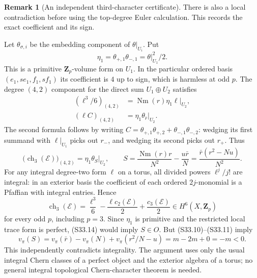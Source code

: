 \documentclass[11pt,a4paper]{article}
\theoremstyle{definition}
\newtheorem{remark}[theorem]{Remark}
\begin{document}
\begin{remark}[An independent third-character certificate]
There is also a local contradiction before using the top-degree Euler calculation. This records the exact coefficient and its sign.

Let \(\theta_{\sigma,i}\) be the embedding component of \(\theta|_{U_i}\). Put \[
 \eta_1=\theta_{+,1}\theta_{-,1}
       =\theta|_{U_1}^2/2.
\] This is a primitive \(\mathbf Z_p\)-volume form on \(U_1\). In the particular ordered basis \((e_1,se_1,f_1,sf_1)\) its coefficient is \(4\) up to sign, which is harmless at odd \(p\). The degree \((4,2)\) component for the direct sum \(U_1\oplus U_2\) satisfies \[
 \begin{aligned}
 (\ell^3/6)_{(4,2)}
    &=\operatorname{Nm}(r)\eta_1\ell|_{U_2},\\
 (\ell C)_{(4,2)}
    &=\eta_1\theta_{\bar r}|_{U_2}.
 \end{aligned}
\] The second formula follows by writing \(C=\theta_{+,1}\theta_{+,2}+\theta_{-,1}\theta_{-,2}\): wedging its first summand with \(\ell|_{U_1}\) picks out \(r_-\), and wedging its second picks out \(r_+\). Thus \[
 \bigl(\operatorname{ch}_3(\mathcal E)\bigr)_{(4,2)}
 =\eta_1\theta_S|_{U_2},
 \qquad
 S=\frac{\operatorname{Nm}(r)r}{N^2}-\frac{u\bar r}{N}
   =\frac{\bar r(r^2-Nu)}{N^2}.
 \tag{S33.14}
\] For any integral degree-two form \(\ell\) on a torus, all divided powers \(\ell^j/j!\) are integral: in an exterior basis the coefficient of each ordered \(2j\)-monomial is a Pfaffian with integral entries. Hence \[
 \operatorname{ch}_3(\mathcal E)
 =\frac{\ell^3}{6}-\frac{\ell c_2(\mathcal E)}2
                         +\frac{c_3(\mathcal E)}2
 \in H^6(X,\mathbf Z_p)
\] for every odd \(p\), including \(p=3\). Since \(\eta_1\) is primitive and the restricted local trace form is perfect, (S33.14) would imply \(S\in O\). But (S33.10)--(S33.11) imply \[
 v_\pi(S)=v_\pi(\bar r)-v_\pi(N)
                  +v_\pi(r^2/N-u)=m-2m+0=-m<0.
\] This independently contradicts integrality. The argument uses only the usual integral Chern classes of a perfect object and the exterior algebra of a torus; no general integral topological Chern-character theorem is needed.
\end{remark}
\end{document}
